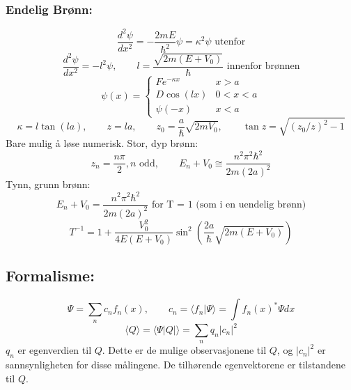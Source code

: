 \documentclass[a4paper,norsk, 10pt]{article}
\begin{document}
\subsubsection{Endelig Brønn:}
\begin{equation}
\frac{d^2\psi}{dx^2} = -\frac{2mE}{\hbar^2}\psi = \kappa^2\psi \text{ utenfor}
\end{equation}
\begin{equation}
\frac{d^2\psi}{dx^2} = -l^2\psi, \qquad l = \frac{\sqrt{2m(E +V_0)}}{\hbar} \text{ innenfor brønnen}
\end{equation}
\begin{equation}
\psi(x) = 
\begin{cases}
Fe^{-\kappa x} & x> a\\
D\cos(lx) & 0<x<a\\
\psi(-x) &x<a
\end{cases}
\end{equation}
\begin{equation}
\kappa = l\tan(la), \qquad z = la, \qquad z_0 = \frac{a}{\hbar}\sqrt{2mV_0},\qquad\tan z = \sqrt{(z_0/z)^2-1} 
\end{equation}
Bare mulig å løse numerisk.
Stor, dyp brønn:
\begin{equation}
z_n = \frac{n\pi}{2}, n \text{ odd},\qquad E_n + V_0 \cong \frac{n^2\pi^2\hbar^2}{2m(2a)^2}
\end{equation}
Tynn, grunn brønn:
\begin{equation}
 E_n + V_0 = \frac{n^2\pi^2\hbar^2}{2m(2a)^2}\text{ for T = 1 (som i en uendelig brønn)}
\end{equation}
\begin{equation}
T^{-1} = 1 + \frac{V_0^2}{4E(E+V_0)}\sin^2\left(\frac{2a}{\hbar}\sqrt{2m(E+V_0)}\right)
\end{equation}

\subsection{Formalisme:}
\begin{equation}
\Psi = \sum_n c_n f_n(x), \qquad c_n = \langle f_n|\Psi\rangle = \int f_n(x)^*\Psi dx
\end{equation}
\begin{equation}
\langle Q\rangle = \langle \Psi |Q|\rangle = \sum_n q_n|c_n|^2
\end{equation}
$q_n$ er egenverdien til $Q$. Dette er de mulige observasjonene til $Q$, og $|c_n|^2$ er sannsynligheten for disse målingene. De tilhørende egenvektorene er tilstandene til $Q$.
\end{document}
